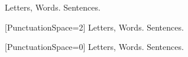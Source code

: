   \nonfrenchspacing
   Letters, Words. Sentences.          \par
  [PunctuationSpace=2]
   Letters, Words. Sentences.          \par
  [PunctuationSpace=0]
   Letters, Words. Sentences.
